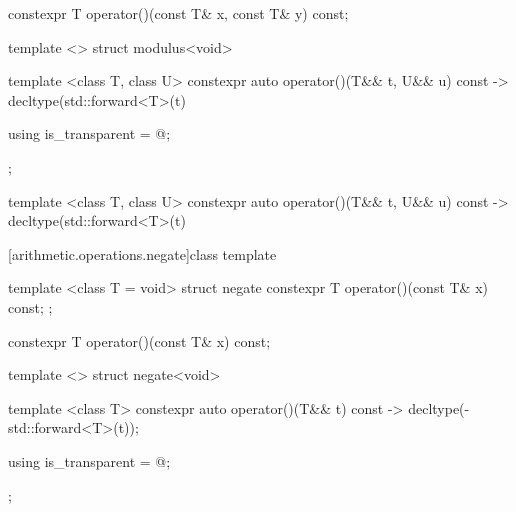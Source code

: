 %
\begin{itemdecl}
constexpr T operator()(const T& x, const T& y) const;
\end{itemdecl}

\begin{itemdescr}
\pnum\returns {}
\end{itemdescr}

%
\begin{itemdecl}
template <> struct modulus<void> {
  template <class T, class U> constexpr auto operator()(T&& t, U&& u) const
    -> decltype(std::forward<T>(t) %

  using is_transparent = @\unspec@;
};
\end{itemdecl}

%
\begin{itemdecl}
template <class T, class U> constexpr auto operator()(T&& t, U&& u) const
    -> decltype(std::forward<T>(t) %
\end{itemdecl}

\begin{itemdescr}
\pnum\returns {}
\end{itemdescr}

[arithmetic.operations.negate]{class template }

%
\begin{itemdecl}
template <class T = void> struct negate {
  constexpr T operator()(const T& x) const;
};
\end{itemdecl}

%
\begin{itemdecl}
constexpr T operator()(const T& x) const;
\end{itemdecl}

\begin{itemdescr}
\pnum\returns {}
\end{itemdescr}

%
\begin{itemdecl}
template <> struct negate<void> {
  template <class T> constexpr auto operator()(T&& t) const
    -> decltype(-std::forward<T>(t));

  using is_transparent = @\unspec@;
};
\end{itemdecl}

